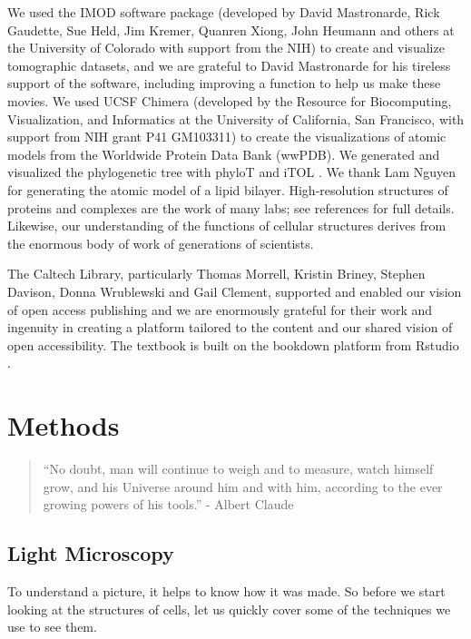 \documentclass[]{tufte-book}
\begin{document}
We used the IMOD software package (developed by David Mastronarde, Rick Gaudette, Sue Held, Jim Kremer, Quanren Xiong, John Heumann and others at the University of Colorado with support from the NIH) to create and visualize tomographic datasets, and we are grateful to David Mastronarde for his tireless support of the software, including improving a function to help us make these movies. We used UCSF Chimera (developed by the Resource for Biocomputing, Visualization, and Informatics at the University of California, San Francisco, with support from NIH grant P41 GM103311) to create the visualizations of atomic models from the Worldwide Protein Data Bank (wwPDB). We generated and visualized the phylogenetic tree with phyloT and iTOL \citep{letunic2019}. We thank Lam Nguyen for generating the atomic model of a lipid bilayer. High-resolution structures of proteins and complexes are the work of many labs; see references for full details. Likewise, our understanding of the functions of cellular structures derives from the enormous body of work of generations of scientists.

The Caltech Library, particularly Thomas Morrell, Kristin Briney, Stephen Davison, Donna Wrublewski and Gail Clement, supported and enabled our vision of open access publishing and we are enormously grateful for their work and ingenuity in creating a platform tailored to the content and our shared vision of open accessibility. The textbook is built on the bookdown platform from Rstudio \citep{xie2016}.

\hypertarget{methods}{%
\chapter{Methods}\label{methods}}

\begin{quote}
``No doubt, man will continue to weigh and to measure, watch himself grow, and his Universe around him and with him, according to the ever growing powers of his tools.''
- Albert Claude \citep{claude1974}
\end{quote}

\hypertarget{light-microscopy}{%
\section{Light Microscopy}\label{light-microscopy}}

To understand a picture, it helps to know how it was made. So before we start looking at the structures of cells, let us quickly cover some of the techniques we use to see them.
\end{document}
